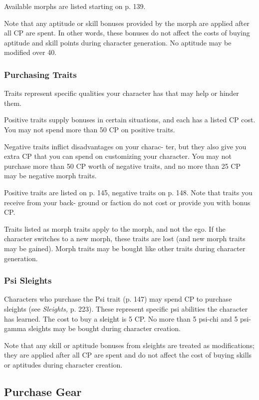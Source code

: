 Available morphs are listed starting on p. 139.

Note that any aptitude or skill bonuses provided by 
the morph are applied after all CP are spent. In other 
words, these bonuses do not affect the costs of buying 
aptitude and skill points during character generation. 
No aptitude may be modified over 40.

\subsubsection{Purchasing Traits}

Traits represent specific qualities your character has 
that may help or hinder them.

Positive traits supply bonuses in certain situations, 
and each has a listed CP cost. You may not spend 
more than 50 CP on positive traits.

Negative traits inflict disadvantages on your charac-
ter, but they also give you extra CP that you can spend 
on customizing your character. You may not purchase 
more than 50 CP worth of negative traits, and no 
more than 25 CP may be negative morph traits.

Positive traits are listed on p. 145, negative traits on 
p. 148. Note that traits you receive from your back-
ground or faction do not cost or provide you with 
bonus CP.

Traits listed as morph traits apply to the morph, and 
not the ego. If the character switches to a new morph, 
these traits are lost (and new morph traits may be 
gained). Morph traits may be bought like other traits 
during character generation.

\subsubsection{Psi Sleights}

Characters who purchase the Psi trait (p. 147) may 
spend CP to purchase sleights (see \textit{Sleights,} p. 223). 
These represent specific psi abilities the character has 
learned. The cost to buy a sleight is 5 CP. No more 
than 5 psi-chi and 5 psi-gamma sleights may be bought 
during character creation.

Note that any skill or aptitude bonuses from 
sleights are treated as modifications; they are applied 
after all CP are spent and do not affect the cost of 
buying skills or aptitudes during character creation.

\subsection{Purchase Gear}

